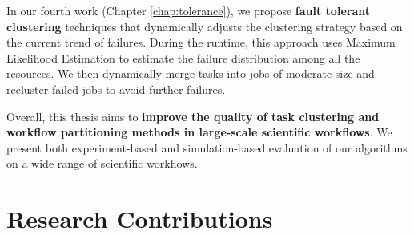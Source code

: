 In our fourth work \cite{Chen2012} (Chapter \ref{chap:tolerance}), we propose \textbf{fault tolerant clustering} techniques that dynamically adjusts the clustering strategy based on the current trend of failures. During the runtime, this approach uses Maximum Likelihood Estimation to estimate the failure distribution among all the resources. We then dynamically merge tasks into jobs of moderate size and recluster failed jobs to avoid further failures.


Overall, this thesis aims to \textbf{improve the quality of task clustering and workflow partitioning methods in large-scale scientific workflows}. We present both experiment-based and simulation-based evaluation of our algorithms on a wide range of scientific workflows. 


\section{Research Contributions}

